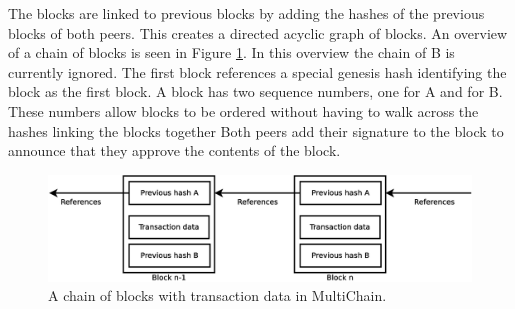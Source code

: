 The blocks are linked to previous blocks by adding the hashes of the previous blocks of both peers.
This creates a directed acyclic graph of blocks.
An overview of a chain of blocks is seen in Figure \ref{fig:transaction-chain}.
In this overview the chain of B is currently ignored.
The first block references a special genesis hash identifying the block as the first block.
A block has two sequence numbers, one for A and for B.
These numbers allow blocks to be ordered without having to walk across the hashes linking the blocks together
Both peers add their signature to the block to announce that they approve the contents of the block.

\begin{figure}
	\centerline{\includegraphics[scale=0.3]{design/figs/transaction-chain.eps}}
	\caption{A chain of blocks with transaction data in MultiChain.}
	\label{fig:transaction-chain}
\end{figure}
